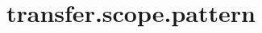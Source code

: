 \section{transfer.scope.pattern}
\label{configuration:TransferScopePattern}
\AvailableInCsharpOnly{\TODO}